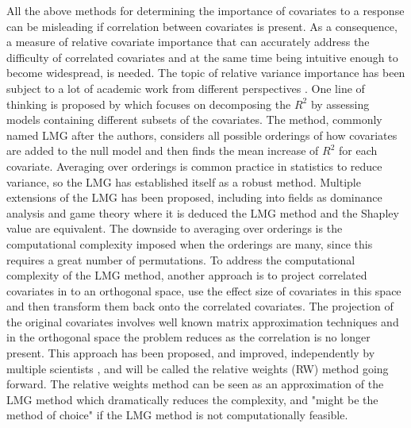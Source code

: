 All the above methods for determining the importance of covariates to a response can be misleading if correlation between covariates is present.
As a consequence, a measure of relative covariate importance that can accurately address the difficulty of correlated covariates and at the same time being intuitive enough to become widespread, is needed.
\newline 
\newline
The topic of relative variance importance has been subject to a lot of academic work from different perspectives \citep{gromping_relaimpo,johnson_relative_weights}. 
One line of thinking is proposed by \citet{Lindeman1980} which focuses on decomposing the $R^2$ by assessing models containing different subsets of the covariates.
The method, commonly named LMG after the authors, considers all possible orderings of how covariates are added to the null model and then finds the mean increase of $R^2$ for each covariate.
Averaging over orderings is common practice in statistics to reduce variance, so the LMG has established itself as a robust method. 
Multiple extensions of the LMG has been proposed, including into fields as dominance analysis \citep{budescu1993dominance} and game theory \citep{Lipovetsky_GameTheory} where it is deduced the LMG method and the Shapley value \citep{Shapley1953StochasticG} are equivalent.
The downside to averaging over orderings is the computational complexity imposed when the orderings are many, since this requires a great number of permutations.
\newline
\newline
To address the computational complexity of the LMG method, another approach is to project correlated covariates in to an orthogonal space, use the effect size of covariates in this space and then transform them back onto the correlated covariates.
The projection of the original covariates involves well known matrix approximation techniques and in the orthogonal space the problem reduces as the correlation is no longer present.
This approach has been proposed, and improved, independently by multiple scientists \citep{johnson_minimization_trace, Fabbris1980, Genizi_relative_weights,johnson_relative_weights}, and will be called the relative weights (RW) method going forward.
The relative weights method can be seen as an approximation of the LMG method which dramatically reduces the complexity, and "might be the method of choice"\citep{Gromping_2015} if the LMG method is not computationally feasible.
\newline
\newline
